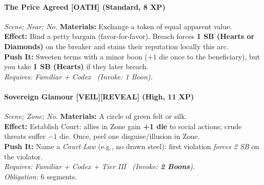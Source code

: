 \paragraph{The Price Agreed \textnormal{[OATH]} (Standard, 8 XP)} \emph{Scene; Near; No.}
\textbf{Materials:} Exchange a token of equal apparent value.\\
\textbf{Effect:} Bind a petty bargain (favor-for-favor). Breach forces \textbf{1 SB (Hearts or Diamonds)} on the breaker and stains their reputation locally this arc.\\
\textbf{Push It:} Sweeten terms with a minor boon (\(+1\) die once to the beneficiary), but you take \textbf{1 SB (Hearts)} if they later breach.\\
\emph{Requires: Familiar + Codex \ (\textit{Invoke:} 1 Boon).}

\paragraph{Sovereign Glamour \textnormal{[VEIL][REVEAL]} (High, 11 XP)} \emph{Scene; Zone; No.}
\textbf{Materials:} A circle of green felt or silk.\\
\textbf{Effect:} Establish Court: allies in Zone gain \textbf{+1 die} to social actions; crude threats suffer \(-1\) die. Once, peel one disguise/illusion in Zone.\\
\textbf{Push It:} Name a \emph{Court Law} (e.g., no drawn steel): first violation \emph{forces 2 SB} on the violator.\\
\emph{Requires: Familiar + Codex + Tier III \ (\textit{Invoke:} \textbf{2 Boons}).}\\
\emph{Obligation:} 6 segments.
